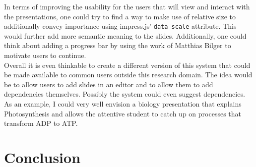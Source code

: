 \documentclass[twoside, 12pt]{article}
\newcommand{\sys}{\textsc{RPresentation}\xspace}
\begin{document}
In terms of improving the usability for the users that will view and interact with the presentations, one could try to find a way to make use of relative size to additionally convey importance using impress.js' \texttt{data-scale} attribute. This would further add more semantic meaning to the slides. Additionally, one could think about adding a progress bar by using the work of Matthias Bilger \cite{bilger:npentrel15} to motivate users to continue.\\

Overall it is even thinkable to create a different version of this system that could be made available to common users outside this research domain. The idea would be to allow users to add slides in an editor and to allow them to add dependencies themselves. Possibly the system could even suggest dependencies. As an example, I could very well envision a biology presentation that explains Photosynthesis and allows the attentive student to catch up on processes that transform ADP to ATP.\\

\section{Conclusion}
\label{sec:conclusion}



\end{document}
